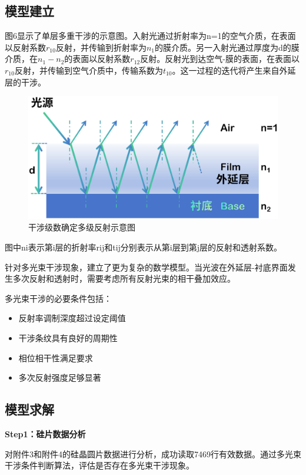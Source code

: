 \documentclass[withoutpreface,bwprint]{cumcmthesis}
\begin{document}
\subsection{模型建立}
图6显示了单层多重干涉的示意图。入射光通过折射率为n=1的空气介质，在表面以反射系数$r_{10}$反射，并传输到折射率为$n_{1}$的膜介质。另一入射光通过厚度为d的膜介质，在$n_{1}-n_{2}$的表面以反射系数$r_{12}$反射。反射光到达空气-膜的表面，在表面以$r_{10}$反射，并传输到空气介质中，传输系数为$t_{10}$。这一过程的迭代将产生来自外延层的干涉。
\begin{figure}[H]
    \centering
    \includegraphics[width=1\linewidth]{figures/问题3原理图.eps}
    \caption{干涉级数确定多级反射示意图}
    \label{fig:placeholder4}
\end{figure}
图中ni表示第i层的折射率rij和tij分别表示从第i层到第j层的反射和透射系数。

针对多光束干涉现象，建立了更为复杂的数学模型。当光波在外延层-衬底界面发生多次反射和透射时，需要考虑所有反射光束的相干叠加效应。

多光束干涉的必要条件包括：
\begin{itemize}[itemindent=2em]
\item 反射率调制深度超过设定阈值
\item 干涉条纹具有良好的周期性
\item 相位相干性满足要求
\item 多次反射强度足够显著
\end{itemize}

\subsection{模型求解}

\textbf{Step1：硅片数据分析} 

对附件3和附件4的硅晶圆片数据进行分析，成功读取7469行有效数据。通过多光束干涉条件判断算法，评估是否存在多光束干涉现象。
\end{document}
